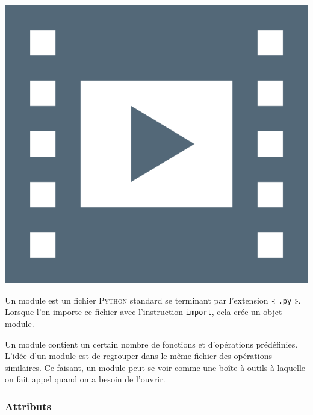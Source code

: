 \begin{marginvideo}
	[\label{vid:XI.9}Modules.]%
	\href{https://www.youtube.com/watch?v=sb9vqobH5Ns&list=PL2CXLryTKuwwlCGfgpApOTmMn7_dbtwWa&index=10}%
	  {\includegraphics[width=\marginparwidth]{./Images/Pictograms/film-strip-dark-electric-blue.png}}%
\end{marginvideo}

Un module est un fichier \textsc{Python} standard se terminant par l'extension « \texttt{.py} ». Lorsque l'on importe ce fichier avec l'instruction \texttt{import}, cela crée un objet module.

Un module contient un certain nombre de fonctions et d'opérations prédéfinies. L'idée d'un module est de regrouper dans le même fichier des opérations similaires. Ce faisant, un module peut se voir comme une boîte à outils à laquelle on fait appel quand on a besoin de l'ouvrir.

\subsubsection[Attributs]{Attributs}
\label{subsub:XI.4.2.1}

